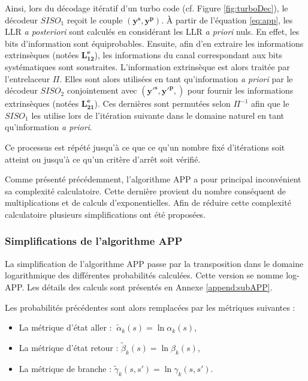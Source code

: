 Ainsi, lors du décodage itératif d'un turbo code (cf. Figure \ref{fig:turboDec}), le décodeur $SISO_1$ reçoit le couple 
$(\mathbf{y^s},\mathbf{y^p})$. À partir de l'équation \ref{eq:app}, les LLR \textit{a posteriori} sont calculés en considérant 
les LLR \textit{a priori} nuls. En effet, les bits d'information sont équiprobables. Ensuite, afin d'en extraire les informations 
extrinsèques (notées $\mathbf{L^e_{12}}$), les informations du canal correspondant aux bits systématiques sont soustraites. 
L'information extrinsèque est alors traitée par l'entrelaceur $\Pi$. Elles sont alors utilisées en tant qu'information 
\textit{a priori} par le décodeur $SISO_2$ conjointement avec $(\mathbf{y'^s},\mathbf{y'^p},)$ pour fournir les informations 
extrinsèques (notées $\mathbf{L^e_{21}}$). Ces dernières sont permutées selon $\Pi^{-1}$ afin que le $SISO_1$ les utilise 
lors de l'itération suivante dans le domaine naturel en tant qu'information \emph{a priori}. 

Ce processus est répété jusqu'à ce que ce qu'un nombre fixé d'itérations soit atteint ou jusqu'à ce qu'un critère d’arrêt 
soit vérifié.

Comme présenté précédemment, l'algorithme APP a pour principal inconvénient sa complexité calculatoire. Cette dernière 
provient du nombre conséquent de multiplications et de calculs d'exponentielles. Afin de réduire cette complexité 
calculatoire plusieurs simplifications ont été proposées.

\subsubsection{Simplifications de l'algorithme APP}
La simplification de l'algorithme APP passe par la transposition dans le domaine logarithmique des différentes probabilités 
calculées. Cette version se nomme log-APP. Les détails des calculs sont présentés en Annexe \ref{append:subAPP}.

Les probabilités précédentes sont alors remplacées par les métriques suivantes : 
\begin{itemize}
	\item La métrique d'état aller : $~\tilde{\alpha}_k(s) = \ln \alpha_k(s)$,
	\item La métrique d'état retour : $\tilde{\beta}_k(s) = \ln \beta_k(s)$,
	\item La métrique de branche : $\tilde{\gamma}_k(s, s') = \ln \gamma_k(s, s')$.\\
\end{itemize}

